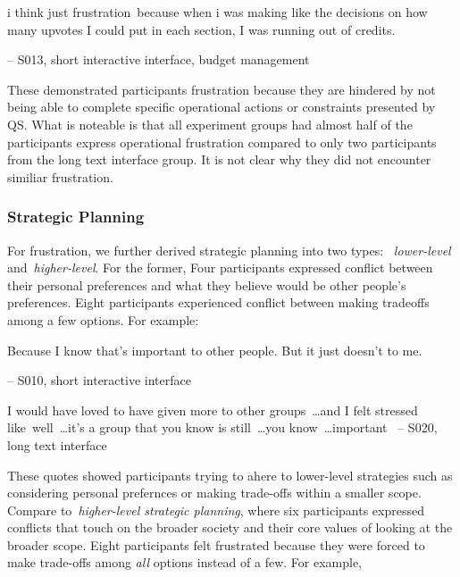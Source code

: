 \begin{displayquote}
i think just frustration~\bracketellipsis because when i was making like the decisions on how many upvotes I could put in each section, I was running out of credits.

\noindent \hfill -- S013, short interactive interface, budget management
\end{displayquote}

These demonstrated participants frustration because they are hindered by not being able to complete specific operational actions or constraints presented by QS. What is noteable is that all experiment groups had almost half of the participants express operational frustration compared to only two participants from the long text interface group. It is not clear why they did not encounter similiar frustration.

\subsubsection{Strategic Planning} For frustration, we further derived strategic planning into two types: ~\textit{lower-level} and~\textit{higher-level}. For the former, Four participants expressed conflict between their personal preferences and what they believe would be other people's preferences. Eight participants experienced conflict between making tradeoffs among a few options. For example:

\begin{displayquote}
Because I know that's important to other people. But it just doesn't to me.
    
\noindent \hfill -- S010, short interactive interface
\end{displayquote}

\begin{displayquote}
I would have loved to have given more to other groups~\ldots and I felt stressed like~\bracketellipsis well~\ldots it's a group that you know is still~\ldots you know~\ldots important~\bracketellipsis
\noindent \hfill -- S020, long text interface
\end{displayquote}

These quotes showed participants trying to ahere to lower-level strategies such as considering personal prefernces or making trade-offs within a smaller scope. Compare to~\textit{higher-level strategic planning}, where six participants expressed conflicts that touch on the broader society and their core values of looking at the broader scope. Eight participants felt frustrated because they were forced to make trade-offs among \textit{all} options instead of a few. For example,

